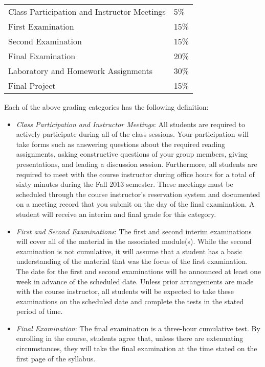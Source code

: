 \begin{center}
\begin{tabular}{ll}
Class Participation and Instructor Meetings & 5\% \\
First Examination & 15\% \\
Second Examination & 15\% \\
Final Examination & 20\% \\
Laboratory and Homework Assignments & 30\% \\
Final Project & 15\%
\end{tabular}
\end{center}

Each of the above grading categories has the following definition:

\begin{itemize}

	\item {\em Class Participation and Instructor Meetings}: All students are required to actively participate during
		all of the class sessions. Your participation will take forms such as answering questions about the required
		reading assignments, asking constructive questions of your group members, giving presentations, and leading a
		discussion session. Furthermore, all students are required to meet with the course instructor during office
		hours for a total of sixty minutes during the Fall 2013 semester.  These meetings must be scheduled through the
		course instructor's reservation system and documented on a meeting record that you submit on the day of the final
		examination. A student will receive an interim and final grade for this category.

	\item {\em First and Second Examinations}: The first and second interim examinations will cover all of the material
		in the associated module(s).  While the second examination is not cumulative, it will assume that a student has a
		basic understanding of the material that was the focus of the first examination.  The date for the first and
		second examinations will be announced at least one week in advance of the scheduled date.  Unless prior
		arrangements are made with the course instructor, all students will be expected to take these examinations on the
		scheduled date and complete the tests in the stated period of time.

	\item {\em Final Examination}: The final examination is a three-hour cumulative test.  By enrolling in the course,
		students agree that, unless there are extenuating circumstances, they will take the final examination at the
		time stated on the first page of the syllabus.


\end{itemize}
